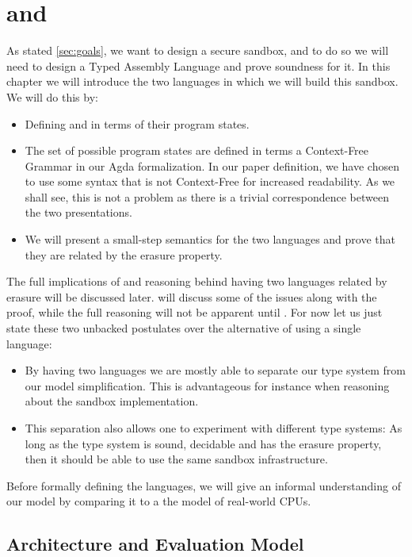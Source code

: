 \chapter{\ATAL and \ATALe}
\label{chap:lang}

As stated \cref{sec:goals}, we want to design a secure sandbox, and to do so we
will need to design a Typed Assembly Language and prove soundness for it. In
this chapter we will introduce the two languages in which we will build this
sandbox. We will do this by:

\begin{itemize}
\item Defining \ATAL and \ATALe in terms of their program states.
\item The set of possible program states are defined in terms a Context-Free
  Grammar in our Agda formalization. In our paper definition, we have chosen to
  use some syntax that is not Context-Free for increased readability. As we
  shall see, this is not a problem as there is a trivial correspondence between
  the two presentations.
\item We will present a small-step semantics for the two languages and prove
  that they are related by the erasure property.
\end{itemize}

The full implications of and reasoning behind having two languages related by
erasure will be discussed later.  will discuss some of the
issues along with the proof, while the full reasoning will not be apparent until
. For now let us just state these two unbacked postulates
over the alternative of using a single language:

\begin{itemize}
\item By having two languages we are mostly able to separate our type system
  from our model simplification. This is advantageous for instance when
  reasoning about the sandbox implementation.
\item This separation also allows one to experiment with different type systems:
  As long as the type system is sound, decidable and has the erasure property,
  then it should be able to use the same sandbox infrastructure.
\end{itemize}

Before formally defining the languages, we will give an informal understanding
of our model by comparing it to a the model of real-world CPUs.

\section{Architecture and Evaluation Model}

